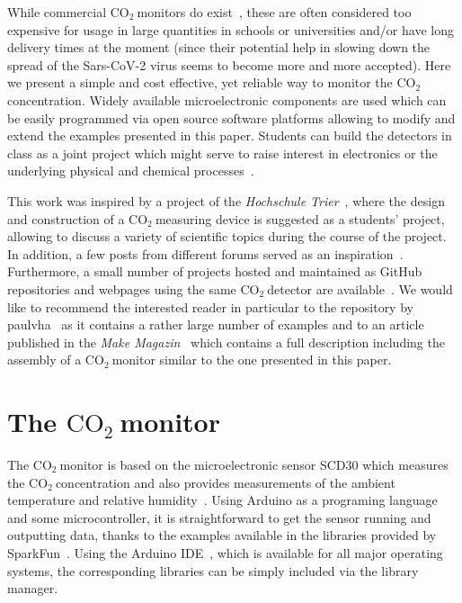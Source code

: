 \documentclass[12pt,a4paper]{article}
\newcommand{\coo}{\ensuremath{\mathrm{CO_2}~}}
\begin{document}
While commercial \coo monitors do exist~\cite{ARANET2020,TFA2020}, these are often considered too expensive for usage in large quantities in schools or universities and/or have long delivery times at the moment (since their potential help in slowing down the spread of the Sars-CoV-2 virus seems to become more and more accepted). Here we present a simple and cost effective, yet reliable way to monitor the \coo concentration. Widely available microelectronic components are used which can be easily programmed via open source software platforms allowing to modify and extend the examples presented in this paper. Students can build the detectors in class as a joint project which might serve to raise interest in electronics or the underlying physical and chemical processes~\cite{WATZKA2011}. 

This work was inspired by a project of the \textit{Hochschule Trier}~\cite{BIRKENFELD2020}, where the design and construction of a \coo measuring device is suggested as a students' project, allowing to discuss a variety of scientific topics during the course of the project. In addition, a few posts from different forums served as an inspiration~\cite{BOYLES2020,METROPOL2020,OMBRA2020,ZENTRIS2020}. Furthermore, a small number of projects hosted and maintained as GitHub repositories and webpages using the same \coo detector are available~\cite{MKETZ2020,NETZBASTELN2020,PAULVHA2020,RUHE2020}. We would like to recommend the interested reader in particular to the repository by paulvha~\cite{PAULVHA2020} as it contains a rather large number of examples and to an article published in the \textit{Make Magazin}~\cite{MAKEMAGAZIN2020} which contains a full description including the assembly of a \coo monitor similar to the one presented in this paper.


\section{The \coo monitor}
The \coo monitor is based on the microelectronic sensor SCD30 which measures the \coo concentration and also provides measurements of the ambient temperature and relative humidity~\cite{SENSIRION2020B}. Using Arduino as a programing language and some microcontroller, it is straightforward to get the sensor running and outputting data, thanks to the examples available in the libraries provided by SparkFun~\cite{SPARKFUN2020}. Using the Arduino IDE~\cite{ARDUINOIDE2020}, which is available for all major operating systems, the corresponding libraries can be simply included via the library manager. 
\end{document}
